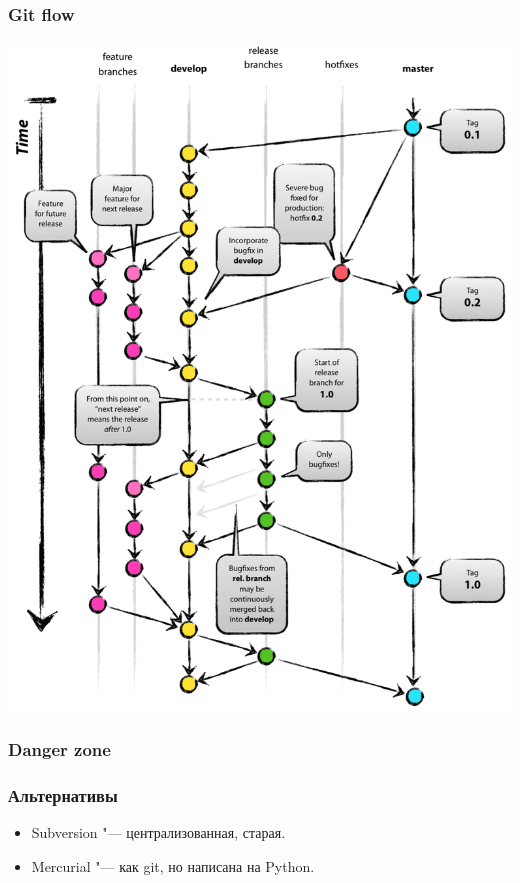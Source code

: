 \documentclass[pdf,russian]{beamer}
\begin{document}
\begin{frame}
    \frametitle{Git flow}
    \pause
    \center
    \includegraphics[height=0.8\textheight]{flow}
\end{frame}

\begin{frame}
    \frametitle{Danger zone}
\end{frame}

\begin{frame}
    \frametitle{Альтернативы}
    \begin{itemize}
        \item Subversion "--- централизованная, старая.
        \item Mercurial "--- как git, но написана на Python.
    \end{itemize}
\end{frame}
\end{document}
